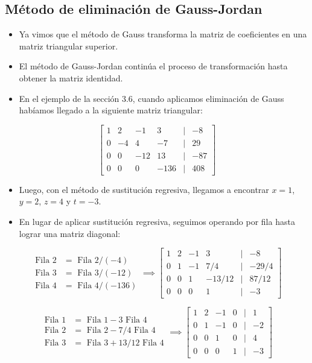 \documentclass[openany]{book}
\providecommand{\tightlist}{%
  \setlength{\itemsep}{0pt}\setlength{\parskip}{0pt}}
\begin{document}
\hypertarget{muxe9todo-de-eliminaciuxf3n-de-gauss-jordan}{%
\subsection{Método de eliminación de Gauss-Jordan}\label{muxe9todo-de-eliminaciuxf3n-de-gauss-jordan}}

\begin{itemize}
\tightlist
\item
  Ya vimos que el método de Gauss transforma la matriz de coeficientes en una matriz triangular superior.
\item
  El método de Gauss-Jordan continúa el proceso de transformación hasta obtener la matriz identidad.
\item
  En el ejemplo de la sección 3.6, cuando aplicamos eliminación de Gauss habíamos llegado a la siguiente matriz triangular:
\end{itemize}

\[
\begin{bmatrix}
1 & 2 & -1 & 3 &|& -8\\
0 & -4 & 4 & -7 &|& 29\\
0 & 0 & -12 & 13 &|& -87\\
0 & 0 & 0 & -136 &|& 408  
\end{bmatrix}
\]

\begin{itemize}
\tightlist
\item
  Luego, con el método de sustitución regresiva, llegamos a encontrar \(x=1\), \(y=2\), \(z=4\) y \(t=-3\).
\item
  En lugar de aplicar sustitución regresiva, seguimos operando por fila hasta lograr una matriz diagonal:
\end{itemize}

\[
\begin{array}{cl}
\text{Fila 2} &= \text{ Fila 2} / (-4) \\ 
\text{Fila 3} &= \text{ Fila 3} /(-12) \\
\text{Fila 4} &= \text{ Fila 4} / (-136) 
\end{array}
\implies
\begin{bmatrix}
1 & 2 & -1 & 3 &|& -8\\
0 & 1 & -1 & 7/4 &|& -29/4\\
0 & 0 & 1 & -13/12 &|& 87/12\\
0 & 0 & 0 & 1 &|& -3  
\end{bmatrix}
\]

\[
\begin{array}{cl}
\text{Fila 1} &= \text{ Fila 1} - 3 \text{ Fila 4} \\ 
\text{Fila 2} &= \text{ Fila 2} - 7/4 \text{ Fila 4}\\
\text{Fila 3} &= \text{ Fila 3} + 13/12 \text{ Fila 4} 
\end{array}
\implies
\begin{bmatrix}
1 & 2 & -1 & 0 &|& 1\\
0 & 1 & -1 & 0 &|& -2\\
0 & 0 & 1 & 0 &|& 4\\
0 & 0 & 0 & 1 &|& -3  
\end{bmatrix}
\]
\end{document}
